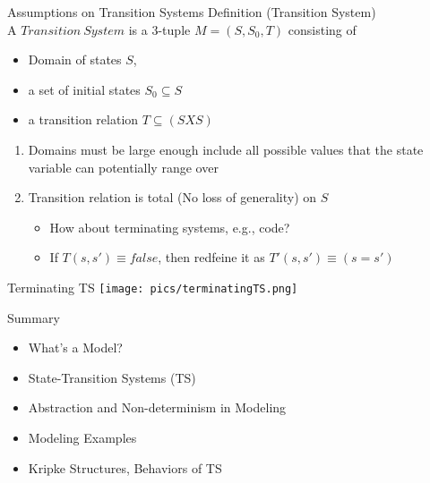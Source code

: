 \documentclass{beamer}
\begin{document}

\begin{frame}{Assumptions on Transition Systems}
Definition (Transition System) \\
A $Transition~System$ is a 3-tuple $M = (S, S_0, T)$ consisting of
\begin{itemize}
\item Domain of states $S$,

\item a set of initial states $S_0 \subseteq S$\item a transition relation $T \subseteq (S X S)$
\end{itemize}

\begin{enumerate}
\item<1-> Domains must be large enough include all possible values that the state variable can potentially range over

\item<2-> Transition relation is total (No loss of generality) on $S$
\begin{itemize}
\item How about terminating systems, e.g., code?
\item If $T(s,s') \equiv false$, then redfeine it as $T'(s,s') \equiv (s=s') $
\end{itemize}
\end{enumerate}
\end{frame}

\begin{frame}{Terminating TS}
\texttt{[image: pics/terminatingTS.png]}
\end{frame}

\begin{frame}{Summary}
\begin{itemize}
\item What's a Model?

\item State-Transition Systems (TS)

\item Abstraction and Non-determinism in Modeling

\item Modeling Examples

\item Kripke Structures, Behaviors of TS
\end{itemize}
\end{frame}
\end{document}
